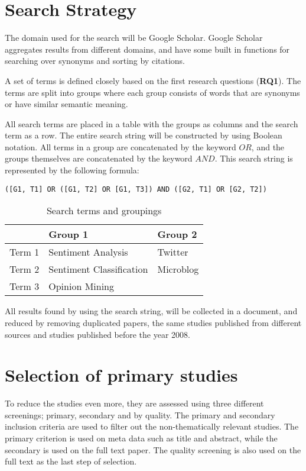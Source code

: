 \section{Search Strategy}

The domain used for the search will be Google Scholar. Google Scholar aggregates results from different domains, and have some built in functions for searching over synonyms and sorting by citations. 

A set of terms is defined closely based on the first research questions (\textbf{RQ1}). The terms are split into groups where each group consists of words that are synonyms or have similar semantic meaning.

All search terms are placed in a table with the groups as columns and the search term as a row. The entire search string will be constructed by using Boolean notation. All terms in a group are concatenated by the keyword $OR$, and the groups themselves are concatenated by the keyword $AND$. This search string is represented by the following formula: 

\begin{verbatim}
([G1, T1] OR ([G1, T2] OR [G1, T3]) AND ([G2, T1] OR [G2, T2]) 
\end{verbatim}

\begin{table}[htdp]
\begin{center}
\begin{tabular}{|l|l|l|}\hline

& Group 1 & Group 2  \\\hline
Term 1 & Sentiment Analysis & Twitter \\\hline
Term 2 & Sentiment Classification & Microblog \\\hline
Term 3 & Opinion Mining &  \\\hline

\end{tabular}
\caption{Search terms and groupings}
\end{center}
\label{tab:searchterms}
\end{table}

All results found by using the search string, will be collected in a document, and reduced by removing duplicated papers, the same studies published from different sources and studies published before the year 2008.


\section{Selection of primary studies}
To reduce the studies even more, they are assessed using three different screenings; primary, secondary and by quality. The primary and secondary inclusion criteria are used to filter out the non-thematically relevant studies. The primary criterion is used on meta data such as title and abstract, while the secondary is used on the full text paper. The quality screening is also used on the full text as the last step of selection.

